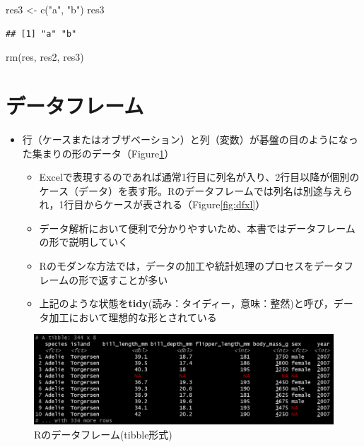 \documentclass[
  xelatex,ja=standard, b5paper]{bxjsbook}
\newenvironment{Shaded}{\begin{snugshade}}{\end{snugshade}}
\newcommand{\FunctionTok}[1]{\textcolor[rgb]{0.00,0.00,0.00}{#1}}
\newcommand{\NormalTok}[1]{#1}
\newcommand{\OtherTok}[1]{\textcolor[rgb]{0.56,0.35,0.01}{#1}}
\newcommand{\StringTok}[1]{\textcolor[rgb]{0.31,0.60,0.02}{#1}}
\providecommand{\tightlist}{%
  \setlength{\itemsep}{0pt}\setlength{\parskip}{0pt}}
\begin{document}
\begin{Shaded}
\begin{Highlighting}[]
\NormalTok{res3 }\OtherTok{\textless{}{-}} \FunctionTok{c}\NormalTok{(}\StringTok{"a"}\NormalTok{, }\StringTok{"b"}\NormalTok{)}
\NormalTok{res3}
\end{Highlighting}
\end{Shaded}

\begin{verbatim}
## [1] "a" "b"
\end{verbatim}

\begin{Shaded}
\begin{Highlighting}[]
\FunctionTok{rm}\NormalTok{(res, res2, res3)}
\end{Highlighting}
\end{Shaded}

\hypertarget{p-df}{%
\section{データフレーム}\label{p-df}}

\begin{itemize}
\tightlist
\item
  行（ケースまたはオブザベーション）と列（変数）が碁盤の目のようになった集まりの形のデータ（Figure\ref{fig:dfr}）

  \begin{itemize}
  \tightlist
  \item
    Excelで表現するのであれば通常1行目に列名が入り、2行目以降が個別のケース（データ）を表す形。Rのデータフレームでは列名は別途与えられ，1行目からケースが表される（Figure\ref{fig:dfxl}）
  \item
    データ解析において便利で分かりやすいため、本書ではデータフレームの形で説明していく
  \item
    Rのモダンな方法では，データの加工や統計処理のプロセスをデータフレームの形で返すことが多い
  \item
    上記のような状態を\textbf{tidy}(読み：タイディー，意味：整然)と呼び，データ加工において理想的な形とされている
  \end{itemize}
\end{itemize}

\begin{figure}

{\centering \includegraphics[width=0.6\linewidth]{images/dfr} 

}

\caption{Rのデータフレーム(tibble形式)}\label{fig:dfr}
\end{figure}
\end{document}
